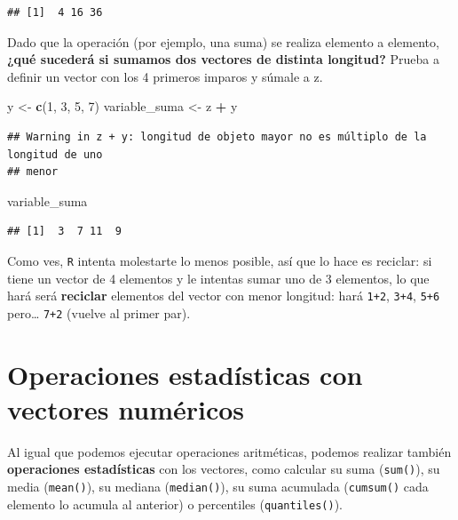 \documentclass[11pt,]{book}
\newenvironment{Shaded}{\begin{snugshade}}{\end{snugshade}}
\newcommand{\DecValTok}[1]{\textcolor[rgb]{0.06,0.06,0.06}{#1}}
\newcommand{\KeywordTok}[1]{\textcolor[rgb]{0.27,0.27,0.27}{\textbf{#1}}}
\newcommand{\NormalTok}[1]{#1}
\newcommand{\OperatorTok}[1]{\textcolor[rgb]{0.43,0.43,0.43}{\textbf{#1}}}
\newcommand{\StringTok}[1]{\textcolor[rgb]{0.5,0.5,0.5}{#1}}
\begin{document}
\begin{verbatim}
## [1]  4 16 36
\end{verbatim}

Dado que la operación (por ejemplo, una suma) se realiza elemento a elemento, \textbf{¿qué sucederá si sumamos dos vectores de distinta longitud?} Prueba a definir un vector con los 4 primeros imparos y súmale a z.

\begin{Shaded}
\begin{Highlighting}[]
\NormalTok{y <-}\StringTok{ }\KeywordTok{c}\NormalTok{(}\DecValTok{1}\NormalTok{, }\DecValTok{3}\NormalTok{, }\DecValTok{5}\NormalTok{, }\DecValTok{7}\NormalTok{)}
\NormalTok{variable_suma <-}\StringTok{ }\NormalTok{z }\OperatorTok{+}\StringTok{ }\NormalTok{y}
\end{Highlighting}
\end{Shaded}

\begin{verbatim}
## Warning in z + y: longitud de objeto mayor no es múltiplo de la longitud de uno
## menor
\end{verbatim}

\begin{Shaded}
\begin{Highlighting}[]
\NormalTok{variable_suma}
\end{Highlighting}
\end{Shaded}

\begin{verbatim}
## [1]  3  7 11  9
\end{verbatim}

Como ves, \texttt{R} intenta molestarte lo menos posible, así que lo hace es reciclar: si tiene un vector de 4 elementos y le intentas sumar uno de 3 elementos, lo que hará será \textbf{reciclar} elementos del vector con menor longitud: hará \texttt{1+2}, \texttt{3+4}, \texttt{5+6} pero\ldots{} \texttt{7+2} (vuelve al primer par).

\hypertarget{operaciones-estaduxedsticas-con-vectores-numuxe9ricos}{%
\section{Operaciones estadísticas con vectores numéricos}\label{operaciones-estaduxedsticas-con-vectores-numuxe9ricos}}

Al igual que podemos ejecutar operaciones aritméticas, podemos realizar también \textbf{operaciones estadísticas} con los vectores, como calcular su suma (\texttt{sum()}), su media (\texttt{mean()}), su mediana (\texttt{median()}), su suma acumulada (\texttt{cumsum()} cada elemento lo acumula al anterior) o percentiles (\texttt{quantiles()}).
\end{document}
